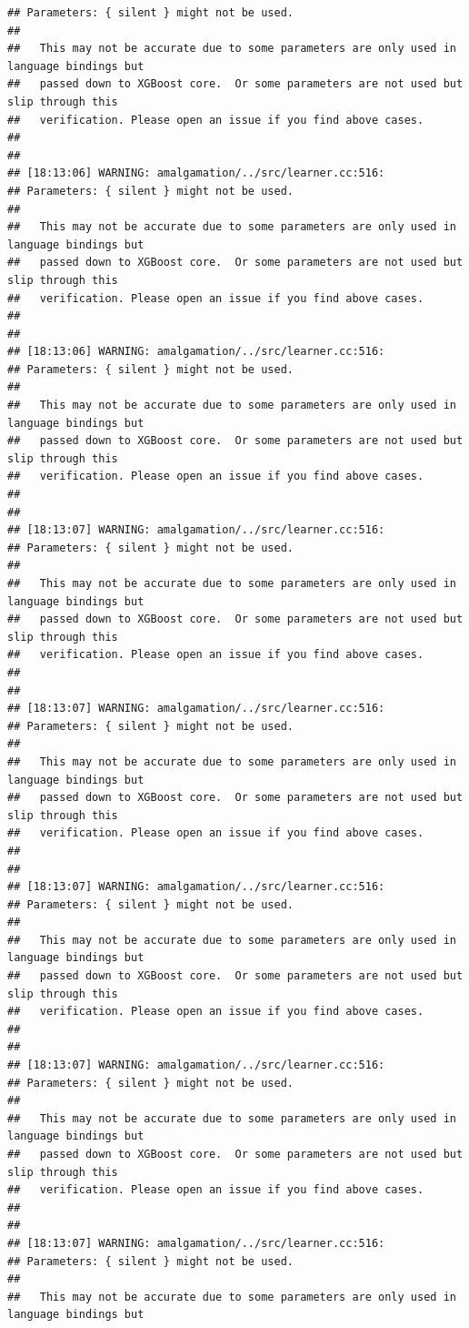 \documentclass[AMS,STIX2COL]{WileyNJD-v2}\usepackage[]{graphicx}\usepackage[]{color}
\makeatletter
\newenvironment{kframe}{%
 \def\at@end@of@kframe{}%
 \ifinner\ifhmode%
  \def\at@end@of@kframe{\end{minipage}}%
  \begin{minipage}{\columnwidth}%
 \fi\fi%
 \def\FrameCommand##1{\hskip\@totalleftmargin \hskip-\fboxsep
 \colorbox{shadecolor}{##1}\hskip-\fboxsep
     \hskip-\linewidth \hskip-\@totalleftmargin \hskip\columnwidth}%
 \MakeFramed {\advance\hsize-\width
   \@totalleftmargin\z@ \linewidth\hsize
   \@setminipage}}%
 {\par\unskip\endMakeFramed%
 \at@end@of@kframe}
\newenvironment{knitrout}{}{} %
\makeatother
\begin{document}
\begin{knitrout}
\begin{kframe}
\begin{verbatim}
## Parameters: { silent } might not be used.
## 
##   This may not be accurate due to some parameters are only used in language bindings but
##   passed down to XGBoost core.  Or some parameters are not used but slip through this
##   verification. Please open an issue if you find above cases.
## 
## 
## [18:13:06] WARNING: amalgamation/../src/learner.cc:516: 
## Parameters: { silent } might not be used.
## 
##   This may not be accurate due to some parameters are only used in language bindings but
##   passed down to XGBoost core.  Or some parameters are not used but slip through this
##   verification. Please open an issue if you find above cases.
## 
## 
## [18:13:06] WARNING: amalgamation/../src/learner.cc:516: 
## Parameters: { silent } might not be used.
## 
##   This may not be accurate due to some parameters are only used in language bindings but
##   passed down to XGBoost core.  Or some parameters are not used but slip through this
##   verification. Please open an issue if you find above cases.
## 
## 
## [18:13:07] WARNING: amalgamation/../src/learner.cc:516: 
## Parameters: { silent } might not be used.
## 
##   This may not be accurate due to some parameters are only used in language bindings but
##   passed down to XGBoost core.  Or some parameters are not used but slip through this
##   verification. Please open an issue if you find above cases.
## 
## 
## [18:13:07] WARNING: amalgamation/../src/learner.cc:516: 
## Parameters: { silent } might not be used.
## 
##   This may not be accurate due to some parameters are only used in language bindings but
##   passed down to XGBoost core.  Or some parameters are not used but slip through this
##   verification. Please open an issue if you find above cases.
## 
## 
## [18:13:07] WARNING: amalgamation/../src/learner.cc:516: 
## Parameters: { silent } might not be used.
## 
##   This may not be accurate due to some parameters are only used in language bindings but
##   passed down to XGBoost core.  Or some parameters are not used but slip through this
##   verification. Please open an issue if you find above cases.
## 
## 
## [18:13:07] WARNING: amalgamation/../src/learner.cc:516: 
## Parameters: { silent } might not be used.
## 
##   This may not be accurate due to some parameters are only used in language bindings but
##   passed down to XGBoost core.  Or some parameters are not used but slip through this
##   verification. Please open an issue if you find above cases.
## 
## 
## [18:13:07] WARNING: amalgamation/../src/learner.cc:516: 
## Parameters: { silent } might not be used.
## 
##   This may not be accurate due to some parameters are only used in language bindings but

\end{verbatim}
\end{kframe}
\end{knitrout}
\end{document}
